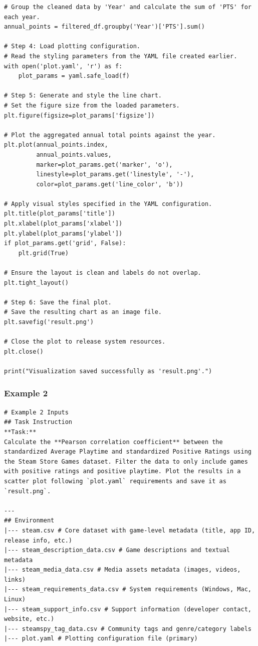 \begin{verbatim}
# Group the cleaned data by 'Year' and calculate the sum of 'PTS' for each year.
annual_points = filtered_df.groupby('Year')['PTS'].sum()

# Step 4: Load plotting configuration.
# Read the styling parameters from the YAML file created earlier.
with open('plot.yaml', 'r') as f:
    plot_params = yaml.safe_load(f)

# Step 5: Generate and style the line chart.
# Set the figure size from the loaded parameters.
plt.figure(figsize=plot_params['figsize'])

# Plot the aggregated annual total points against the year.
plt.plot(annual_points.index, 
         annual_points.values,
         marker=plot_params.get('marker', 'o'),
         linestyle=plot_params.get('linestyle', '-'),
         color=plot_params.get('line_color', 'b'))

# Apply visual styles specified in the YAML configuration.
plt.title(plot_params['title'])
plt.xlabel(plot_params['xlabel'])
plt.ylabel(plot_params['ylabel'])
if plot_params.get('grid', False):
    plt.grid(True)

# Ensure the layout is clean and labels do not overlap.
plt.tight_layout()

# Step 6: Save the final plot.
# Save the resulting chart as an image file.
plt.savefig('result.png')

# Close the plot to release system resources.
plt.close()

print("Visualization saved successfully as 'result.png'.")
\end{verbatim}


\subsubsection{Example 2}
\begin{verbatim}
# Example 2 Inputs
## Task Instruction
**Task:**  
Calculate the **Pearson correlation coefficient** between the standardized Average Playtime and standardized Positive Ratings using the Steam Store Games dataset. Filter the data to only include games with positive ratings and positive playtime. Plot the results in a scatter plot following `plot.yaml` requirements and save it as `result.png`.

---
## Environment
|--- steam.csv # Core dataset with game-level metadata (title, app ID, release info, etc.)
|--- steam_description_data.csv # Game descriptions and textual metadata
|--- steam_media_data.csv # Media assets metadata (images, videos, links)
|--- steam_requirements_data.csv # System requirements (Windows, Mac, Linux)
|--- steam_support_info.csv # Support information (developer contact, website, etc.)
|--- steamspy_tag_data.csv # Community tags and genre/category labels
|--- plot.yaml # Plotting configuration file (primary)
\end{verbatim}

